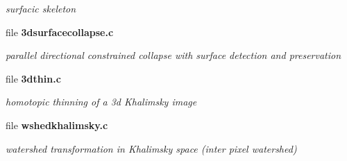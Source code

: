 \begin{DoxyCompactItemize}
\begin{DoxyCompactList}\small\item\em surfacic skeleton \item\end{DoxyCompactList}

\item 
file {\bf 3dsurfacecollapse.c}


\begin{DoxyCompactList}\small\item\em parallel directional constrained collapse with surface detection and preservation \item\end{DoxyCompactList}

\item 
file {\bf 3dthin.c}


\begin{DoxyCompactList}\small\item\em homotopic thinning of a 3d Khalimsky image \item\end{DoxyCompactList}

\item 
file {\bf wshedkhalimsky.c}


\begin{DoxyCompactList}\small\item\em watershed transformation in Khalimsky space (inter pixel watershed) \item\end{DoxyCompactList}

\end{DoxyCompactItemize}
